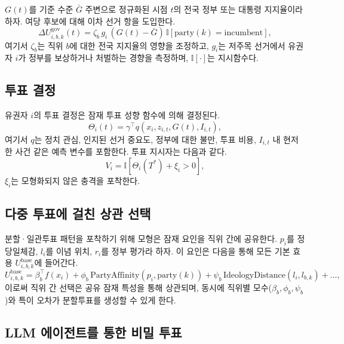 \documentclass[11pt]{article}
\begin{document}
$G(t)$를 기준 수준 $\bar{G}$ 주변으로 정규화된 시점 $t$의 전국 정부 또는 대통령 지지율이라 하자. 여당 후보에 대해 이차 선거 항을 도입한다.
\begin{equation}
\Delta U^{\text{gov}}_{i,b,k}(t) = \zeta_b \, g_i \, (G(t) - \bar{G}) \, \mathbb{I}[\text{party}(k) = \text{incumbent}],
\end{equation}
여기서 $\zeta_b$는 직위 $b$에 대한 전국 지지율의 영향을 조정하고, $g_i$는 저주목 선거에서 유권자 $i$가 정부를 보상하거나 처벌하는 경향을 측정하며, $\mathbb{I}[\cdot]$는 지시함수다.

\subsection{투표 결정}

유권자 $i$의 투표 결정은 잠재 투표 성향 함수에 의해 결정된다.
\begin{equation}
\Theta_i(t) = \gamma^\top q(x_i, z_{i,t}, G(t), I_{i,t}),
\end{equation}
여기서 $q$는 정치 관심, 인지된 선거 중요도, 정부에 대한 불만, 투표 비용, $I_{i,t}$ 내 현저한 사건 같은 예측 변수를 포함한다. 투표 지시자는 다음과 같다.
\begin{equation}
V_i = \mathbb{I}[\Theta_i(T^*) + \xi_i > 0],
\end{equation}
$\xi_i$는 모형화되지 않은 충격을 포착한다.

\subsection{다중 투표에 걸친 상관 선택}

분할·일관투표 패턴을 포착하기 위해 모형은 잠재 요인을 직위 간에 공유한다. $p_i$를 정당일체감, $l_i$를 이념 위치, $r_i$를 정부 평가라 하자. 이 요인은 다음을 통해 모든 기본 효용 $U^{\text{base}}_{i,b,k}$에 들어간다.
\begin{equation}
U^{\text{base}}_{i,b,k} = \beta_b^\top f(x_i) + \phi_b \, \text{PartyAffinity}(p_i, \text{party}(k)) + \psi_b \, \text{IdeologyDistance}(l_i, l_{b,k}) + \dots,
\end{equation}
이로써 직위 간 선택은 공유 잠재 특성을 통해 상관되며, 동시에 직위별 모수($\beta_b, \phi_b, \psi_b$)와 특이 오차가 분할투표를 생성할 수 있게 한다.

\subsection{LLM 에이전트를 통한 비밀 투표}
\end{document}
